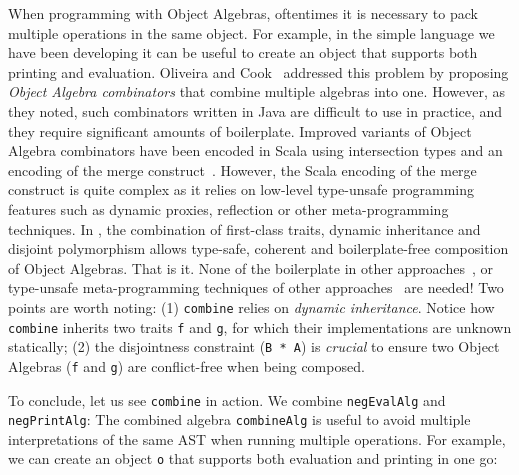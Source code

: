 When programming with Object Algebras, oftentimes it is necessary to pack
multiple operations in the same object. For example, in the simple language we
have been developing it can be useful to create an object that supports both
printing and evaluation. Oliveira and Cook~\cite{oliveira2012extensibility}
addressed this problem by proposing \emph{Object Algebra combinators} that
combine multiple algebras into one. However, as they noted, such combinators
written in Java are difficult to use in practice, and they require significant
amounts of boilerplate. Improved variants of Object Algebra combinators have
been encoded in Scala using intersection types and an encoding of the merge
construct~\cite{oliveira2013feature, rendel14attributes}. However, the
Scala encoding of the merge construct is quite complex as it relies on low-level
type-unsafe programming features such as dynamic proxies, reflection or other
meta-programming techniques. In \sedel, the combination of first-class
traits, dynamic inheritance and disjoint polymorphism allows type-safe, coherent
and boilerplate-free composition of Object Algebras.
That is it. None of the boilerplate in other
approaches~\cite{oliveira2012extensibility}, or type-unsafe meta-programming
techniques of other approaches~\cite{oliveira2013feature,rendel14attributes} are
needed! Two points are worth noting: (1) \lstinline{combine} relies on
\emph{dynamic inheritance}. Notice how \lstinline{combine} inherits two traits
\lstinline{f} and \lstinline{g}, for which their implementations are unknown
statically; (2) the disjointness constraint (\lstinline{B * A}) is \emph{crucial} to
ensure two Object Algebras (\lstinline{f} and \lstinline{g}) are conflict-free
when being composed.

To conclude, let us see \lstinline{combine} in action. We combine \lstinline{negEvalAlg} and \lstinline{negPrintAlg}:
The combined algebra \lstinline{combineAlg} is useful to avoid multiple interpretations
of the same AST when running multiple operations. For example, we can
create an object \lstinline{o} that supports both evaluation and printing in one go:




